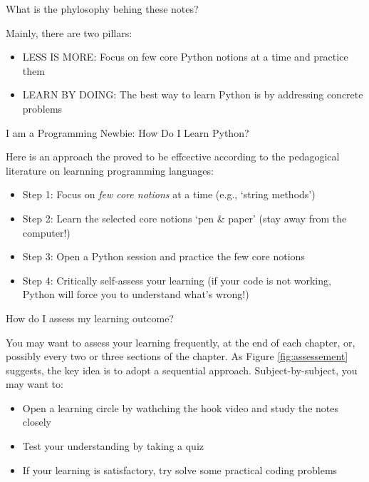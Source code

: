 \documentclass[a4paper,11pt]{book}
\numberwithin{figure}{chapter}
\numberwithin{table}{chapter}
\newcommand{\question}[1]{%
    \begin{tcolorbox}[colback=comp_c!10,colframe=comp_c,sidebyside align=top,width=\linewidth,before skip=1ex]
        #1
    \end{tcolorbox}
    \switchcolumn%
}
\newcommand{\note}[1]{%
    \begin{tcolorbox}[colback=white!0,colframe=white!10,width=\linewidth,before skip=1ex]
        #1
    \end{tcolorbox}
}
\begin{document}
\begin{paracol}{2}
	\question{\raggedright What is the phylosophy behing these notes?}
	\note{Mainly, there are two pillars:
	
	\begin{itemize}
		\item LESS IS MORE: Focus on few core Python notions at a time and practice them
		\item LEARN BY DOING: The best way to learn Python is by addressing concrete problems
	\end{itemize}
	
	}
\end{paracol}

\begin{paracol}{2}
	\question{\raggedright I am a Programming Newbie: How Do I Learn Python?}
	\note{
		Here is an approach the proved to be effcective according to the pedagogical literature on learnning programming languages:

	\begin{itemize}
		\item Step 1: Focus on \emph{few core notions} at a time (e.g., `string methods')
		\item Step 2: Learn the selected core notions `pen \& paper'  (stay away from the computer!)
		\item Step 3: Open a Python session and practice the few core notions 
		\item Step 4: Critically self-assess your learning (if your code is not working, Python will force you to understand what's wrong!)
	\end{itemize}

	}
\end{paracol}

\begin{paracol}{2}
	\question{\raggedrith How do I assess my learning outcome?}
	\note{You may want to assess your learning frequently, at the end of each chapter, or, possibly every two or three sections of the chapter. As Figure \ref{fig:assessement} suggests, the key idea is to adopt a sequential approach. Subject-by-subject, you may want to:
	\begin{itemize}
		\item Open a learning circle by wathching the hook video and study the notes closely
		\item Test your understanding by taking a quiz
		\item If your learning is satisfactory, try solve some practical coding problems
	\end{itemize}
	}
\end{paracol}
\clearpage 
\end{document}
